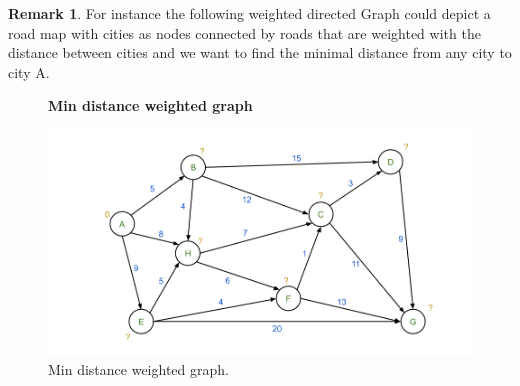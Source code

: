 \documentclass{article}
\theoremstyle{definition}
\newtheorem{remark}[theorem]{Remark}
\newcommand*{\figuretitle}[1]{%
    {\centering%
    \textbf{#1}%
    \par\medskip}%
}
\begin{document}
\begin{remark}
For instance the following weighted directed Graph could depict a road map with cities as nodes connected by roads that are weighted with the distance between cities and we want to find the minimal distance from any city to city A. \

\begin{figure}[H]
\centering
\figuretitle{Min distance weighted graph}
\includegraphics[scale=0.5]{graphics/weighted_directed_graph_2.png}
\caption{Min distance weighted graph.}
\label{fig:neuron}
\end{figure}


\end{remark}
\end{document}
